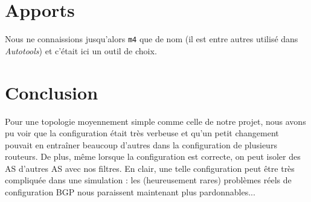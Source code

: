 \documentclass[10pt,a4paper,twocolumn]{article}
\begin{document}
\section{Apports}
Nous ne connaissions jusqu'alors \texttt{m4} que de nom (il est entre autres utilisé dans \textit{Autotools}) et c'était ici un outil de choix.

\section{Conclusion}
Pour une topologie moyennement simple comme celle de notre projet, nous avons pu voir que la configuration était très verbeuse et qu'un petit changement pouvait en entraîner beaucoup d'autres dans la configuration de plusieurs routeurs. De plus,
même lorsque la configuration est correcte, on peut isoler des AS d'autres AS avec nos filtres.
En clair, une telle configuration peut être très compliquée dans une simulation : les (heureusement rares) problèmes réels de configuration BGP nous paraissent maintenant plus pardonnables...
\end{document}
